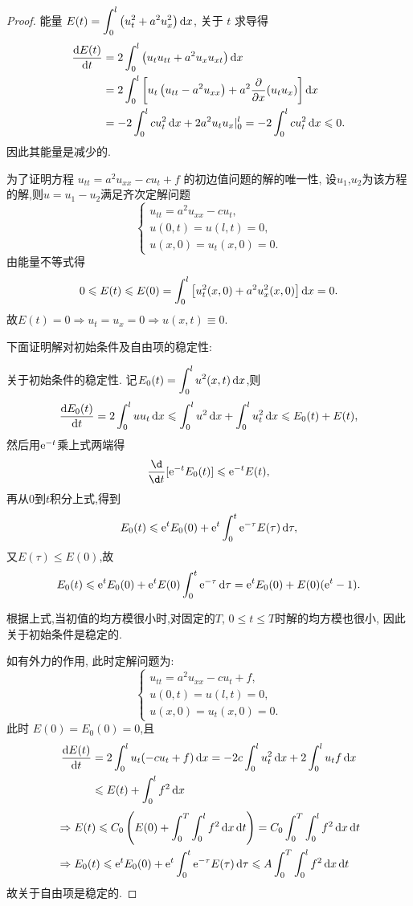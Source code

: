 \begin{proof}
  能量 $\displaystyle E(t)=\int_0^l\left(u_t^2+a^2u_x^2\right)\mathop{}\!\mathrm{d} x$, 关于 $t$ 求导得
  \begin{align*}
    \frac{\mathop{}\!\mathrm{d} E(t)}{\mathop{}\!\mathrm{d} t}
    & = 2\int_0^l\left(u_tu_{tt}+a^2u_xu_{xt}\right)\mathop{}\!\mathrm{d} x \\
    & = 2\int_0^l\left[u_t\left(u_{tt}-a^2u_{xx}\right)
        + a^2\frac{\partial}{\partial x}(u_tu_x)\right]\mathop{}\!\mathrm{d} x \\
    & = -2\int_0^lcu_t^2\mathop{}\!\mathrm{d} x+2a^2u_tu_x|_0^l=-2\int_0^lcu_t^2\mathop{}\!\mathrm{d} x\leqslant 0.
  \end{align*}
  因此其能量是减少的.
  
  为了证明方程 $u_{tt}=a^2u_{xx}-cu_t+f$ 的初边值问题的解的唯一性, 设$u_1$,$u_2$为该方程的解,则$u=u_1-u_2$满足齐次定解问题
  \[\begin{cases}
    u_{tt}=a^2u_{xx}-cu_t, \\
    u(0,t)=u(l,t)=0, \\
    u(x,0)=u_t(x,0)=0.
  \end{cases}\]
  由能量不等式得
  \[0\leqslant E(t)\leqslant E(0)=\int_0^l\left[u_t^2(x,0)+a^2u_x^2(x,0)\right]\mathop{}\!\mathrm{d} x = 0.\]
  故$E(t)=0\Rightarrow u_t=u_x=0\Rightarrow u(x,t)\equiv 0$.
  
  下面证明解对初始条件及自由项的稳定性:

  \textbullet 关于初始条件的稳定性. 记$\displaystyle E_0(t)=\int_0^lu^2(x,t)\mathop{}\!\mathrm{d} x$,则
  \[\frac{\mathop{}\!\mathrm{d} E_0(t)}{\mathop{}\!\mathrm{d} t}
    = 2\int_0^luu_t\mathop{}\!\mathrm{d} x\leqslant\int_0^lu^2\mathop{}\!\mathrm{d} x+\int_0^lu_t^2\mathop{}\!\mathrm{d} x\leqslant E_0(t)+E(t),\]
  然后用$\mathrm{e}^{-t}$乘上式两端得
  \[\frac{\d}{\d t}[\e^{-t}E_0(t)]\leq \e^{-t}E(t),\]
  再从$0$到$t$积分上式,得到
  \[E_0(t) \leqslant \mathrm{e}^tE_0(0)+\mathrm{e}^t\int_0^t\mathrm{e}^{-\tau}E(\tau)\mathop{}\!\mathrm{d}\tau,\]
  又$E(\tau)\leq E(0)$,故
  \[E_0(t)\leqslant \mathrm{e}^tE_0(0)+\mathrm{e}^tE(0)\int_0^t\mathrm{e}^{-\tau}\mathop{}\!\mathrm{d}\tau = \mathrm{e}^tE_0(0)+E(0)(\mathrm{e}^t-1).\]
  
  根据上式,当初值的均方模很小时,对固定的$T$, $0\leq t\leq T$时解的均方模也很小, 因此关于初始条件是稳定的.

  \textbullet 如有外力的作用, 此时定解问题为:
  \[\begin{cases}
    u_{tt}=a^2u_{xx}-cu_t+f, \\
    u(0,t)=u(l,t)=0, \\
    u(x,0)=u_t(x,0)=0.
  \end{cases}\]
  此时 $E(0)=E_0(0)=0$,且
  \[\begin{split}
    \frac{\mathop{}\!\mathrm{d} E(t)}{\mathop{}\!\mathrm{d} t}&=2\int_0^lu_t(-cu_t+f)\mathop{}\!\mathrm{d} x=-2c\int_0^lu_t^2\mathop{}\!\mathrm{d} x+2\int_0^lu_tf\mathop{}\!\mathrm{d} x\\
    &\leqslant E(t)+\int_0^lf^2\mathop{}\!\mathrm{d} x
  \end{split}\]
  \[\begin{split}
    &\Rightarrow E(t)\leqslant C_0\left(E(0)+\int_0^T\int_0^lf^2\mathop{}\!\mathrm{d} x\mathop{}\!\mathrm{d} t\right)=C_0\int_0^T\int_0^lf^2\mathop{}\!\mathrm{d} x\mathop{}\!\mathrm{d} t\\
    &\Rightarrow E_0(t)\leqslant \mathrm{e}^tE_0(0)+\mathrm{e}^t\int_0^t\mathrm{e}^{-\tau}E(\tau)\mathop{}\!\mathrm{d}\tau\leqslant A\int_0^T\int_0^lf^2\mathop{}\!\mathrm{d} x\mathop{}\!\mathrm{d} t
    \end{split}\]
  故关于自由项是稳定的.
\end{proof}


